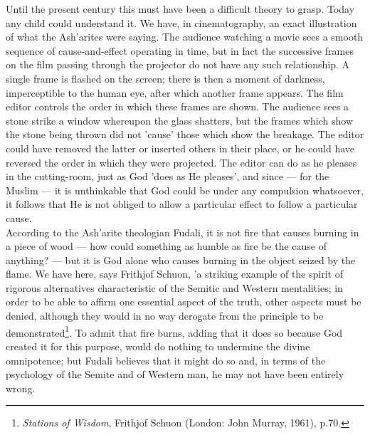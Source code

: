 \documentclass[11pt, b5paper, twoside]{book}
\begin{document}
Until the present century this must have been a difficult theory to grasp. Today any child could 
understand it. We have, in cinematography, an exact illustration of what the Ash'arites were saying. 
The audience watching a movie sees a smooth sequence of cause-and-effect operating in time, but in 
fact the successive frames on the film passing through the projector do not have any such 
relationship. A single frame is flashed on the screen; there is then a moment of darkness, 
imperceptible to the human eye, after which another frame appears. The film editor controls the order 
in which these frames are shown. The audience sees a stone strike a window whereupon the glass 
shatters, but the frames which show the stone being thrown did not 'cause' those which show the 
breakage. The editor could have removed the latter or inserted others in their place, or he could 
have reversed the order in which they were projected. The editor can do as he pleases in the 
cutting-room, just as God 'does as He pleases', and since --- for the Muslim --- it is unthinkable that 
God could be under any compulsion whatsoever, it follows that He is not obliged to allow a particular 
effect to follow a particular cause. \\

According to the Ash'arite theologian Fudali, it is not fire that causes burning in a piece of wood --- 
how could something as humble as fire be the cause of anything? --- but it is God alone who causes 
burning in the object seized by the flame. We have here, says Frithjof Schuon, 'a striking example of 
the spirit of rigorous alternatives characteristic of the Semitic and Western mentalities; in order 
to be able to affirm one essential aspect of the truth, other aspects must be denied, although they 
would in no way derogate from the principle to be demonstrated\footnote{\emph{Stations of Wisdom}, Frithjof Schuon (London: John Murray, 1961), p.70.}. To admit that fire burns, adding 
that it does so because God created it for this purpose, would do nothing to undermine the divine 
omnipotence; but Fudali believes that it might do so and, in terms of the psychology of the Semite 
and of Western man, he may not have been entirely wrong. \\
\end{document}
